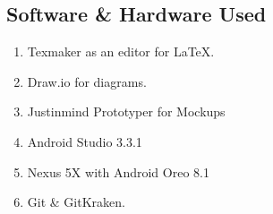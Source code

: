 \subsection{Software \& Hardware Used}
\begin{enumerate}
\item Texmaker as an editor for \LaTeX.
\item Draw.io for diagrams.
\item Justinmind Prototyper for Mockups
\item Android Studio 3.3.1
\item Nexus 5X with Android Oreo 8.1
\item Git \& GitKraken.
\end{enumerate}